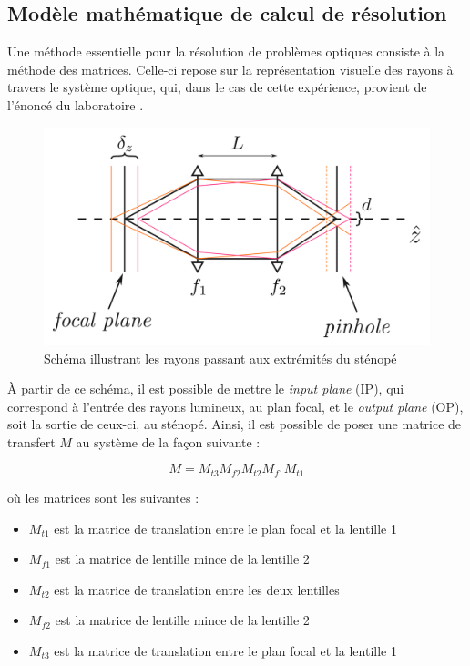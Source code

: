 \documentclass[11pt,letterpaper]{article}
\begin{document}
\subsection{Modèle mathématique de calcul de résolution}
Une méthode essentielle pour la résolution de problèmes optiques consiste à la méthode des matrices. 
Celle-ci repose sur la représentation visuelle des rayons à travers le système optique, qui, dans le 
cas de cette expérience, provient de l'énoncé du laboratoire \cite{sheehy_experience_2024}.

\begin{figure}[H]
  \centering
  \includegraphics[scale=0.15]{rayons_pinhole.png}
  \caption{Schéma illustrant les rayons passant aux extrémités du sténopé}
  \label{rayons}
\end{figure}

À partir de ce schéma, il est possible de mettre le \textit{input plane} (IP), qui correspond à 
l'entrée des rayons lumineux, au plan focal, et le \textit{output plane} (OP), soit la sortie de
ceux-ci, au sténopé. Ainsi, il est possible de poser une matrice de transfert $M$ au système de la 
façon suivante :

\begin{equation}
  M = M_{t3}M_{f2}M_{t2}M_{f1}M_{t1}
\end{equation}

où les matrices sont les suivantes :

\begin{itemize}
\item $M_{t1}$ est la matrice de translation entre le plan focal et la lentille 1
\item $M_{f1}$ est la matrice de lentille mince de la lentille 2
\item $M_{t2}$ est la matrice de translation entre les deux lentilles
\item $M_{f2}$ est la matrice de lentille mince de la lentille 2
\item $M_{t3}$ est la matrice de translation entre le plan focal et la lentille 1
\end{itemize}
\end{document}
